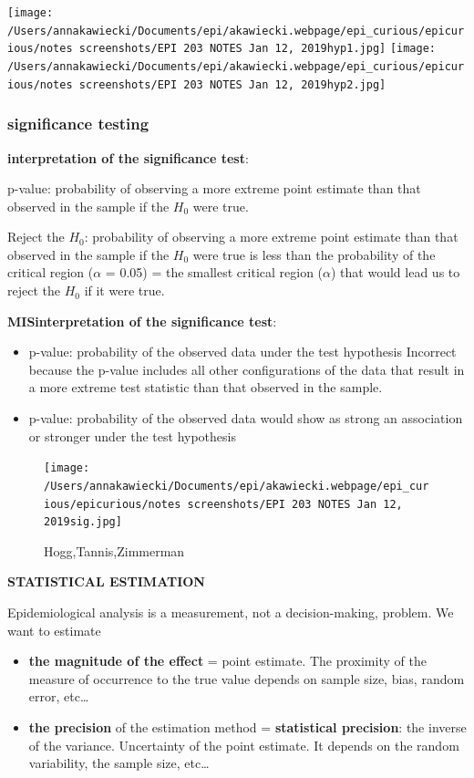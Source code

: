 \documentclass[
]{article}
\begin{document}
\texttt{[image: /Users/annakawiecki/Documents/epi/akawiecki.webpage/epi\_curious/epicurious/notes screenshots/EPI 203 NOTES Jan 12, 2019hyp1.jpg]}
\texttt{[image: /Users/annakawiecki/Documents/epi/akawiecki.webpage/epi\_curious/epicurious/notes screenshots/EPI 203 NOTES Jan 12, 2019hyp2.jpg]}

\hypertarget{significance-testing}{%
\subsubsection{significance testing}\label{significance-testing}}

\textbf{interpretation of the significance test}:

p-value: probability of observing a more extreme point estimate than
that observed in the sample if the \(H_0\) were true.

Reject the \(H_0\): probability of observing a more extreme point
estimate than that observed in the sample if the \(H_0\) were true is
less than the probability of the critical region (\(\alpha\) = 0.05) =
the smallest critical region (\(\alpha\)) that would lead us to reject
the \(H_0\) if it were true.

\textbf{MISinterpretation of the significance test}:

\begin{itemize}
\item
  p-value: probability of the observed data under the test hypothesis
  Incorrect because the p-value includes all other configurations of the
  data that result in a more extreme test statistic than that observed
  in the sample.
\item
  p-value: probability of the observed data would show as strong an
  association or stronger under the test hypothesis
\end{itemize}

\begin{figure}
\centering
\texttt{[image: /Users/annakawiecki/Documents/epi/akawiecki.webpage/epi\_curious/epicurious/notes screenshots/EPI 203 NOTES Jan 12, 2019sig.jpg]}
\caption{Hogg,Tannis,Zimmerman}
\end{figure}

\textbf{STATISTICAL ESTIMATION}

Epidemiological analysis is a measurement, not a decision-making,
problem. We want to estimate

\begin{itemize}
\item
  \textbf{the magnitude of the effect} = point estimate. The proximity
  of the measure of occurrence to the true value depends on sample size,
  bias, random error, etc\ldots{}
\item
  \textbf{the precision} of the estimation method = \textbf{statistical
  precision}: the inverse of the variance. Uncertainty of the point
  estimate. It depends on the random variability, the sample size,
  etc\ldots{}
\end{itemize}
\end{document}

